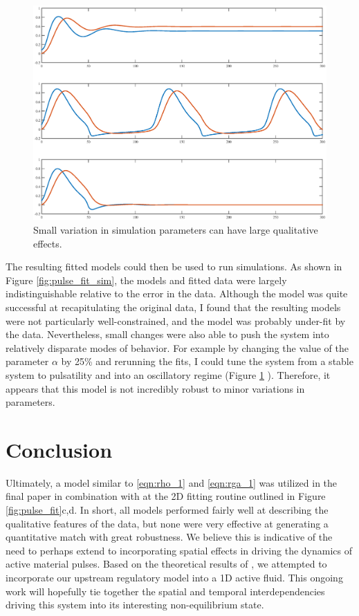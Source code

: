 \begin{figure}[h!]
	\centering
	\includegraphics[width=\hsize]{pulse/model_compare.eps}
	\caption{\label{fig:pulse_fit_compare}  Small variation in simulation parameters can have large qualitative effects.}
\end{figure}

The resulting fitted models could then be used to run simulations.  As shown in Figure \ref{fig:pulse_fit_sim}, the models and fitted data were largely indistinguishable relative to the error in the data.  Although the model was quite successful at recapitulating the original data, I found that the resulting models were not particularly well-constrained, and the model was probably under-fit by the data. Nevertheless, small changes were also able to push the system into relatively disparate modes of behavior.  For example by changing the value of the parameter $\alpha$ by 25\% and rerunning the fits, I could tune the system from a stable system to pulsatility and into an oscillatory regime (Figure \ref{fig:pulse_fit_compare} ).  Therefore, it appears that this model is not incredibly robust to minor variations in parameters. 


\section{Conclusion}
Ultimately, a model similar to \ref{eqn:rho_1} and \ref{eqn:rga_1} was utilized in the final paper in combination with at the 2D fitting routine outlined in Figure \ref{fig:pulse_fit}c,d.   In short, all models performed fairly well at describing the qualitative features of the data, but none were very effective at generating a quantitative match with great robustness.    We believe this is indicative of the need to perhaps extend to incorporating spatial effects in driving the dynamics of active material pulses.  Based on the theoretical results of \cite{PhysRevLett.106.028103}, we attempted to incorporate our upstream regulatory model into a 1D active fluid.  This ongoing work will hopefully tie together the spatial and temporal interdependencies driving this system into its interesting non-equilibrium state.

